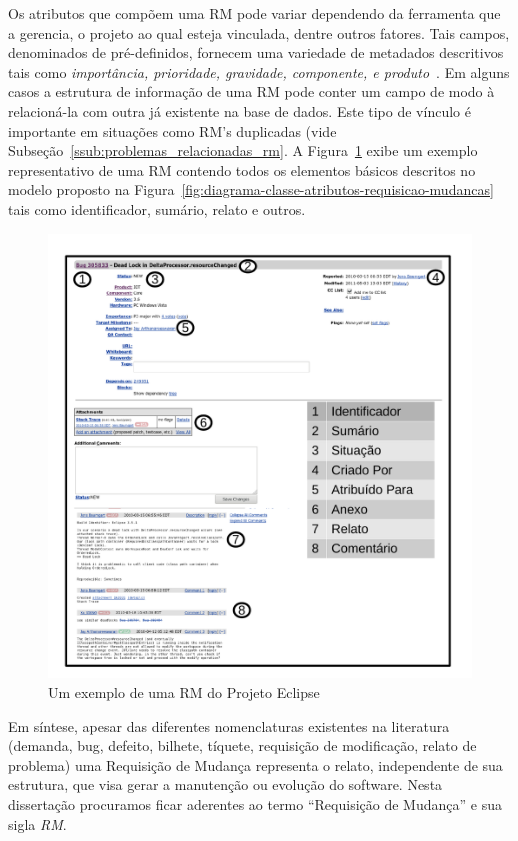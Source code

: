 Os atributos que compõem uma RM pode variar dependendo da ferramenta que a
gerencia, o projeto ao qual esteja vinculada, dentre outros fatores. Tais
campos, denominados de pré-definidos, fornecem uma variedade de metadados
descritivos tais como \textit{importância, prioridade, gravidade, componente, e
	produto}~\cite{zhang2016literature}. Em alguns casos a estrutura de
informação de uma RM pode conter um campo de modo à relacioná-la com outra já
existente na base de dados. Este tipo de vínculo é importante em situações como
RM's duplicadas (vide Subseção~\ref{ssub:problemas_relacionadas_rm}. A
Figura~\ref{fig:rm-exemplo} exibe um exemplo representativo de uma RM contendo
todos os elementos básicos descritos no modelo proposto na
Figura~\ref{fig:diagrama-classe-atributos-requisicao-mudancas} tais como
identificador, sumário, relato e outros.

\begin{figure}[htpb]
	\centering
	\includegraphics[width=0.8\linewidth]{./chapter-manutencao-software-visao-geral/img/rm-exemplo.pdf}
	\caption{Um exemplo de uma RM do Projeto Eclipse}
	\label{fig:rm-exemplo}
\end{figure}
\todoend

 Em síntese,
apesar das diferentes nomenclaturas existentes na literatura (demanda, bug,
defeito, bilhete, tíquete, requisição de modificação, relato de problema) uma
Requisição de Mudança representa o relato, independente de sua estrutura, que
visa gerar a manutenção ou evolução do software. Nesta dissertação procuramos
ficar aderentes ao termo ``Requisição de Mudança'' e sua sigla \textit{RM}.

